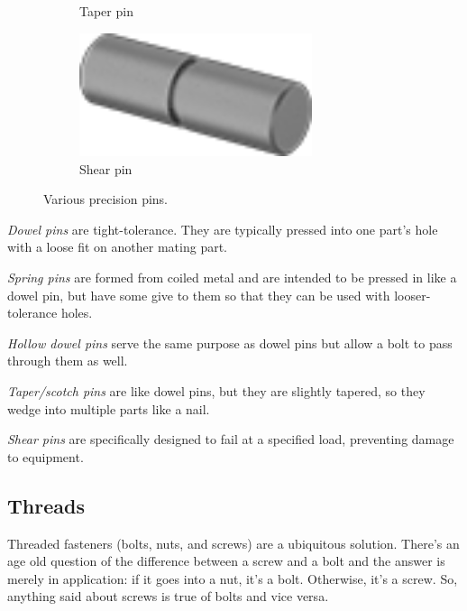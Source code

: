 \begin{figure}[H]
\begin{subfigure}[b]{.19\linewidth}
			\caption{Taper pin}
		\end{subfigure}\begin{subfigure}[b]{.19\linewidth}
			\includegraphics[width=0.75\textwidth]{imgs/shpin.png}
			\caption{Shear pin}
		\end{subfigure}
		\caption{Various precision pins.}
	\end{figure}
	
	\begin{asparaenum}[a)]
		\item \textit{Dowel pins} are tight-tolerance. They are typically pressed into one part's hole with a loose fit on another mating part.
		\item \textit{Spring pins} are formed from coiled metal and are intended to be pressed in like a dowel pin, but have some give to them so that they can be used with looser-tolerance holes.
		\item \textit{Hollow dowel pins} serve the same purpose as dowel pins but allow a bolt to pass through them as well. 
		\item \textit{Taper/scotch pins} are like dowel pins, but they are slightly tapered, so they wedge into multiple parts like a nail.
		\item \textit{Shear pins} are specifically designed to fail at a specified load, preventing damage to equipment.
	\end{asparaenum}
	
	\subsection{Threads} \label{subsec:threads}
	Threaded fasteners (bolts, nuts, and screws) are a ubiquitous solution. There's an age old question of the difference between a screw and a bolt and the answer is merely in application: if it goes into a nut, it's a bolt. Otherwise, it's a screw. So, anything said about screws is true of bolts and vice versa.
	
